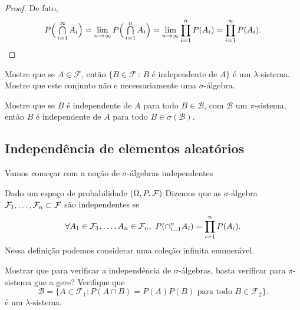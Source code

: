 \begin{proof}
  De fato,
  \begin{equation*}
    P\Big( \operatorname*{{\textstyle \bigcap}}_{i=1}^{\infty} A_i \Big) = \lim_{n\to \infty} P\Big( \operatorname*{{\textstyle \bigcap}}_{i = 1}^n A_i \Big) = \lim_{n\to \infty} \prod\limits_{i=1}^n P(A_i) = \prod\limits_{i=1}^{\infty} P(A_i). \qedhere
  \end{equation*}
\end{proof}

\begin{exercise}
  Mostre que se $A \in \mathcal{F}$, então $\{B \in \mathcal{F}\, : \, B \text{ é independente de } A\}$ é um $\lambda$-sistema.
  Mostre que este conjunto não e necessariamente uma $\sigma$-álgebra.
\end{exercise}

\begin{exercise}
  Mostre que se $B$ é independente de $A$ para todo $B \in \mathcal{B}$, com $\mathcal{B}$ um $\pi$-sistema, então $B$ é independente de $A$ para todo $B \in \sigma(\mathcal{B})$.
\end{exercise}

\subsection{Independência de elementos aleatórios}


Vamos começar com a noção de $\sigma$-álgebras independentes
\begin{definition}
  Dado um espaço de probabilidade $(\Omega,P,{\mathcal F})$
Dizemos que as $\sigma$-álgebra ${\mathcal F}_1,\dots,{\mathcal F}_n\subset {\ensuremath{\mathcal F}}$
são independentes 
se
\begin{equation}
 \forall A_1\in {\ensuremath{\mathcal F}}_1,\dots ,A_n \in {\ensuremath{\mathcal F}}_n, \ P(\cap_{i=1}^n A_i)=\prod_{i=1}^n P(A_i).
\end{equation}
Nessa definição podemos considerar uma coleção infinita enumerável.
\end{definition}

{\color{purple}
  \begin{proposition}
    \label{p:independencia_pi}
    Mostrar que para verificar a independência de $\sigma$-álgebras, basta verificar para $\pi$-sistema gue a gere?
    Verifique que
    \begin{equation}
      \mathcal{B} = \{A \in \mathcal{F}_1; P(A \cap B) = P(A) P(B)
      \text{ para todo $B \in \mathcal{F}_2$}\}.
    \end{equation}
    é um $\lambda$-sistema.
  \end{proposition}
}


